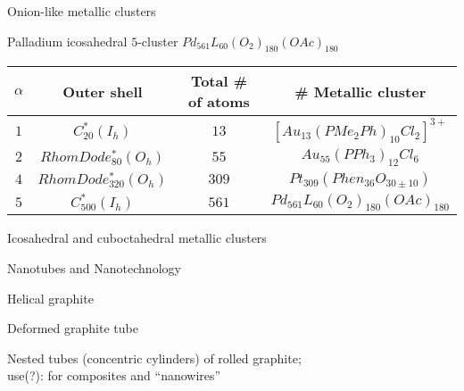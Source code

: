 \documentclass[%
pdf,
colorBG,
slideColor,
]{prosper}
\begin{document}
\begin{slide}{Onion-like metallic clusters}
\vspace{-0.7cm}
\begin{center}
\begin{minipage}{8.5cm}
\centering
{}\par
Palladium icosahedral $5$-cluster $Pd_{561}L_{60}(O_2)_{180}(OAc)_{180}$
\end{minipage}
\end{center}

{\scriptsize
\begin{center}
\begin{tabular}{|c|c|c|c|}
\hline
$\alpha$   & Outer shell   &  Total \# of atoms   & \# Metallic cluster\\
\hline
$1$    &  $C_{20}^*(I_h)$    & $13$     &  $[Au_{13}(PMe_2Ph)_{10}Cl_2]^{3+}$\\
$2$    &  $RhomDode_{80}^{*}(O_h)$  & $55$  &$Au_{55}(PPh_3)_{12}  Cl_{6}$\\
$4$    &   $RhomDode_{320}^{*}(O_h)$ & $309$  &$Pt_{309}(Phen_{36}O_{30\pm 10})$\\
$5$    &  $C_{500}^*(I_h)$    & $561$ &  $Pd_{561}L_{60}(O_2)_{180}(OAc)_{180}$\\
\hline
\end{tabular}
\end{center}
\begin{center}
Icosahedral and cuboctahedral metallic clusters
\end{center}
}

\end{slide}







\begin{slide}{Nanotubes and Nanotechnology}
\vspace{-0.6cm}
\begin{center}
\begin{minipage}[b]{5.5cm}
\centering
{}\par
Helical graphite
\end{minipage}
\begin{minipage}[b]{5.5cm}
\centering
{}\par
Deformed graphite tube
\end{minipage}
\end{center}

\begin{center}
Nested tubes (concentric cylinders) of rolled graphite;\\
use(?): for composites and ``nanowires''
\end{center}
\end{slide}
\end{document}
